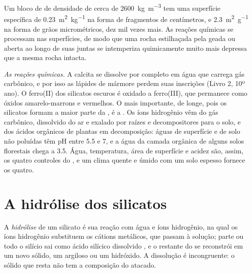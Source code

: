 Um bloco de  de densidade de cerca de \qty{2600}{kg.m^{-3}} tem uma superfície específica de \qty{0.23}{m^2.kg^{-1}} na forma de fragmentos de centímetros, e \qty{2.3}{m^2.g^{-1}} na forma de grãos micrométricos, dez mil vezes mais. As reações químicas se processam nas superfícies, de modo que uma rocha estilhaçada pela geada ou aberta ao longo de suas juntas se intemperiza quimicamente muito mais depressa que a mesma rocha intacta.

\emph{As reações químicas.} A calcita se dissolve por completo em água que carrega gás carbônico, e por isso as lápides de mármore perdem suas inscrições (Livro 2, 10º ano). O ferro(II) dos silicatos escuros é oxidado a ferro(III), que permanece como óxidos amarelo-marrons e vermelhos. O mais importante, de longe, pois os silicatos formam a maior parte da , é a . Os íons hidrogênio vêm do gás carbônico, dissolvido do ar e exalado por raízes e decompositores para o solo, e dos ácidos orgânicos de plantas em decomposição: águas de superfície e de solo não poluídas têm pH entre 5.5 e 7, e a água da camada orgânica de alguns solos florestais chega a 3.5. Água, temperatura, área de superfície e acidez são, assim, os quatro controles do , e um clima quente e úmido com um solo espesso fornece os quatro.

\section{A hidrólise dos silicatos}\label{sec:b1:weathering-clays:hydrolysis}

\begin{definition}\label{def:b1:weathering-clays:hydrolysis}
A \emph{hidrólise} de um silicato é sua reação com água e íons hidrogênio, na qual os íons hidrogênio substituem os cátions metálicos, que passam à solução; parte ou todo o silício sai como ácido silícico dissolvido , e o restante do  se reconstrói em um novo sólido, um  argiloso ou um hidróxido. A dissolução é incongruente: o sólido que resta não tem a composição do  atacado.
\end{definition}

